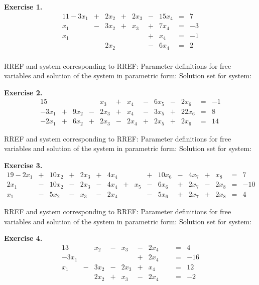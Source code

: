 \documentclass[12pt]{article}
\begin{document}
\textbf{Exercise 1.}
\begin{alignat*}{11}
- 3 x_{1} &{}+{}& 2 x_{2} &{}+{}& 2 x_{3} &{}-{}& 15 x_{4} &{}={}&7\\ 
x_{1} &{}-{}& 3 x_{2} &{}+{}& x_{3} &{}+{}& 7 x_{4} &{}={}&-3\\ 
x_{1}&{}{}&&{}{}& &{}+{}& x_{4} &{}={}&-1\\ 
&{}{}&2 x_{2}&{}{}& &{}-{}& 6 x_{4} &{}={}&2\\ 
\end{alignat*}

RREF and system corresponding to RREF:
\vskip2in
Parameter definitions for free variables and solution of the system in parametric form:
\vskip2in
Solution set for system:
\clearpage

\textbf{Exercise 2.}
\begin{alignat*}{15}
&{}{}&&{}{}&x_{3} &{}+{}& x_{4} &{}-{}& 6 x_{5} &{}-{}& 2 x_{6} &{}={}&-1\\ 
- 3 x_{1} &{}+{}& 9 x_{2} &{}-{}& 2 x_{3} &{}+{}& x_{4} &{}-{}& 3 x_{5} &{}+{}& 22 x_{6} &{}={}&8\\ 
- 2 x_{1} &{}+{}& 6 x_{2} &{}+{}& 2 x_{3} &{}-{}& 2 x_{4} &{}+{}& 2 x_{5} &{}+{}& 2 x_{6} &{}={}&14 
\end{alignat*}

RREF and system corresponding to RREF:
\vskip2in
Parameter definitions for free variables and solution of the system in parametric form:
\vskip2in
Solution set for system:
\clearpage

\textbf{Exercise 3.}
\begin{alignat*}{19}
- 2 x_{1} &{}+{}& 10 x_{2} &{}+{}& 2 x_{3} &{}+{}& 4 x_{4}&{}{}& &{}+{}& 10 x_{6} &{}-{}& 4 x_{7} &{}+{}& x_{8} &{}={}&7\\ 
2 x_{1} &{}-{}& 10 x_{2} &{}-{}& 2 x_{3} &{}-{}& 4 x_{4} &{}+{}& x_{5} &{}-{}& 6 x_{6} &{}+{}& 2 x_{7} &{}-{}& 2 x_{8} &{}={}&-10\\ 
x_{1} &{}-{}& 5 x_{2} &{}-{}& x_{3} &{}-{}& 2 x_{4}&{}{}& &{}-{}& 5 x_{6} &{}+{}& 2 x_{7} &{}+{}& 2 x_{8} &{}={}&4 
\end{alignat*}

RREF and system corresponding to RREF:
\vskip2in
Parameter definitions for free variables and solution of the system in parametric form:
\vskip2in
Solution set for system:
\clearpage

\textbf{Exercise 4.}
\begin{alignat*}{13}
&{}{}&x_{2} &{}-{}& x_{3} &{}-{}& 2 x_{4}&{}{}& &{}={}&4\\ 
- 3 x_{1}&{}{}&&{}{}& &{}+{}& 2 x_{4}&{}{}& &{}={}&-16\\ 
x_{1} &{}-{}& 3 x_{2} &{}-{}& 2 x_{3} &{}+{}& x_{4}&{}{}& &{}={}&12\\ 
&{}{}&2 x_{2} &{}+{}& x_{3} &{}-{}& 2 x_{4}&{}{}& &{}={}&-2 
\end{alignat*}
\end{document}
